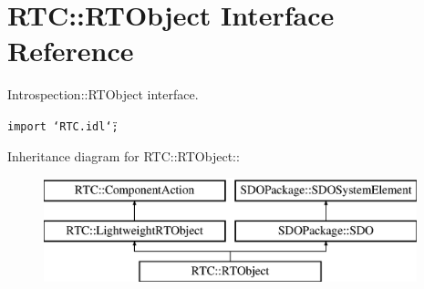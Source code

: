 \section{RTC::RTObject Interface Reference}
\label{interfaceRTC_1_1RTObject}
Introspection::RTObject interface.  


{\tt import \char`\"{}RTC.idl\char`\"{};}

Inheritance diagram for RTC::RTObject::\begin{figure}[H]
\begin{center}
\leavevmode
\includegraphics[height=3cm]{interfaceRTC_1_1RTObject}
\end{center}
\end{figure}
